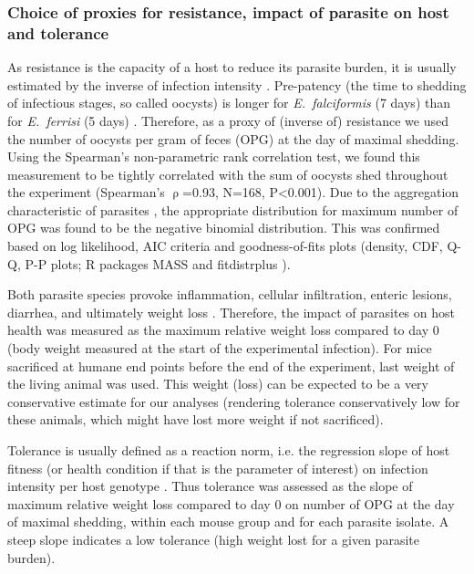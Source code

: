 \documentclass[12pt]{article}
\begin{document}
\subsubsection{Choice of proxies for resistance, impact of parasite on host and tolerance}
As resistance is the capacity of a host to reduce its parasite burden, it is usually estimated by the inverse of infection intensity \citep{raaberg_decomposing_2009}. Pre-patency (the time to shedding of infectious stages, so called oocysts) is longer for \textit{E.~falciformis} (7 days) than for \textit{E.~ferrisi} (5 days) \citep{al-khlifeh_eimeria_2019}. Therefore, as a proxy of (inverse of) resistance we used the number of oocysts per gram of feces (OPG) at the day of maximal shedding. Using the Spearman's non-parametric rank correlation test, we found this measurement to be tightly correlated with the sum of oocysts shed throughout the experiment (Spearman's $\uprho$=0.93, N=168, P<0.001). Due to the aggregation characteristic of parasites \citep{shaw_patterns_1995}, the appropriate distribution for maximum number of OPG was found to be the negative binomial distribution. This was confirmed based on log likelihood, AIC criteria and goodness-of-fits plots (density, CDF, Q-Q, P-P plots; R packages MASS \citep{venables_modern_2002} and fitdistrplus \citep{delignette-muller_fitdistrplus_2015}). \par

Both parasite species provoke inflammation, cellular infiltration, enteric lesions, diarrhea, and ultimately weight loss \citep{ankrom_life_1975, ehret_dual_2017, schito_comparison_1996, al-khlifeh_eimeria_2019}. Therefore, the impact of parasites on host health was measured as the maximum relative weight loss compared to day 0 (body weight measured at the start of the experimental infection). For mice sacrificed at humane end points before the end of the experiment, last weight of the living animal was used. This weight (loss) can be expected to be a very conservative estimate for our analyses (rendering tolerance conservatively low for these animals, which might have lost more weight if not sacrificed). \par

Tolerance is usually defined as a reaction norm, i.e. the regression slope of host fitness (or health condition if that is the parameter of interest) on infection intensity per host genotype \citep{Simms2000, raaberg_decomposing_2009}. Thus tolerance was assessed as the slope of maximum relative weight loss compared to day 0 on number of OPG at the day of maximal shedding, within each mouse group and for each parasite isolate. A steep slope indicates a low tolerance (high weight lost for a given parasite burden).
\end{document}
